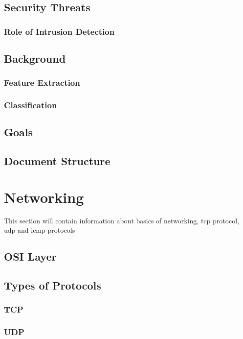 \documentclass[12pt]{article}
\begin{document}
	
		\subsection{Security Threats}
		\lipsum[1-3]
			\subsubsection{Role of Intrusion Detection}
			\lipsum[1-2]
		
		\subsection{Background}
			\lipsum[1-2]
			\subsubsection{Feature Extraction}
			\lipsum[1]
	
			\subsubsection{Classification}
			\lipsum[1]			
		\subsection{Goals}
		\lipsum[1-3]
		
		\subsection{Document Structure}
		\lipsum[1-2]
	
	
	\cleardoublepage
	\section{Networking}\label{sec:networking}
	This section will contain information about basics of networking, tcp protocol, udp and icmp protocols
		\subsection{OSI Layer}
		\lipsum[1-3]
		\subsection{Types of Protocols}
		\lipsum[1]
			\subsubsection{TCP}
			\lipsum[1]
			\subsubsection{UDP}
			\lipsum[1]
\end{document}
